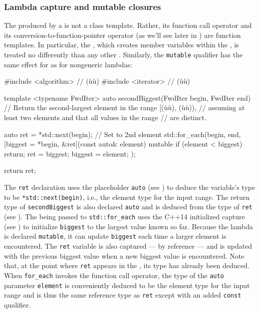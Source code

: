 \subsubsection[Lambda capture and mutable closures]{Lambda capture and mutable closures}\label{lambda-capture-and-mutable-closures}

The  produced by a  is not a
class template. Rather, its function call operator and its
conversion-to-function-pointer operator (as we'll see later in ) are function templates. In
particular, the , which creates member variables
within the , is treated no differently than any
other . Similarly, the \lstinline!mutable!
qualifier has the same effect for  as for
nongeneric lambdas:

\begin{emcppslisting}
#include <algorithm>  // (ù{}ù)
#include <iterator>   // (ù{}ù)

template <typename FwdIter>
auto secondBiggest(FwdIter begin, FwdIter end)
    // Return the second-largest element in the range [(ù{}ù), (ù{}ù)),
    // assuming at least two elements and that all values in the range
    // are distinct.
{
    auto ret = *std::next(begin);  // Set to 2nd element
    std::for_each(begin, end,
        [biggest = *begin, &ret](const auto& element) mutable
        {
            if (element < biggest) { return; }
            ret = biggest;
            biggest = element;
        }
    );

    return ret;
}
\end{emcppslisting}
    

\noindent The \lstinline!ret! declaration uses the placeholder \lstinline!auto! (see
) to deduce the variable's type to be
\lstinline!*std::next(begin)!, i.e., the element type for the input range.
The return type of \lstinline!secondBiggest! is also declared \lstinline!auto!
and is deduced from the type of \lstinline!ret! (see
). The  being passed to
\lstinline!std::for_each! uses the C++14 initialized capture (see
) to initialize \lstinline!biggest! to the
largest value known so far. Because the lambda is declared
\lstinline!mutable!, it can update \lstinline!biggest! each time a larger
element is encountered. The \lstinline!ret! variable is also captured ---
by reference --- and is updated with the previous biggest value when a
new biggest value is encountered. Note that, at the point where
\lstinline!ret! appears in the , its type has
already been deduced. When \lstinline!for_each! invokes the function call
operator, the type of the \lstinline!auto! parameter \lstinline!element! is
conveniently deduced to be the element type for the input range and is
thus the same reference type as \lstinline!ret! except with an added
\lstinline!const! qualifier.

